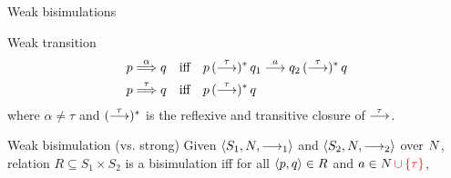 \documentclass[aspectratio=169]{beamer}
\begin{document}





\begin{slide}{Weak bisimulations}
\small


\begin{block}{Weak transition}
\vspace{-6mm}
\begin{align*}
  p \stackrel{\alpha}{\Longrightarrow} q ~~~&\text{iff}~~~
  p \,(\stackrel{\tau}{\longrightarrow})^{*}\, q_1\stackrel{a}{\longrightarrow} q_2 \,(\stackrel{\tau}{\longrightarrow})^{*}\, q
  \\
  p \stackrel{\tau}{\Longrightarrow} q ~~~&\text{iff}~~~
  p \,(\stackrel{\tau}{\longrightarrow})^{*}\, q
\end{align*}  
where $\alpha \neq \tau$ and $(\stackrel{\tau}{\longrightarrow})^{*}$ is the reflexive and transitive closure of $\stackrel{\tau}{\longrightarrow}$.
\end{block}

\begin{block}{Weak bisimulation (vs. strong)}
Given  $\mathopen{\langle}S_1, N,  \longrightarrow_1\mathclose{\rangle}$  and $\mathopen{\langle}S_2, N, \longrightarrow_2\mathclose{\rangle}$ over $N$,
relation $R \subseteq S_1 \times S_2$ is a \alert{bisimulation} iff for all $\mathopen{\langle}p,q\mathclose{\rangle} \in R$ and $a \in N\,\textcolor{red}{\cup \left\{ \tau \right\}}$,


\end{block}
\end{slide}
\end{document}
